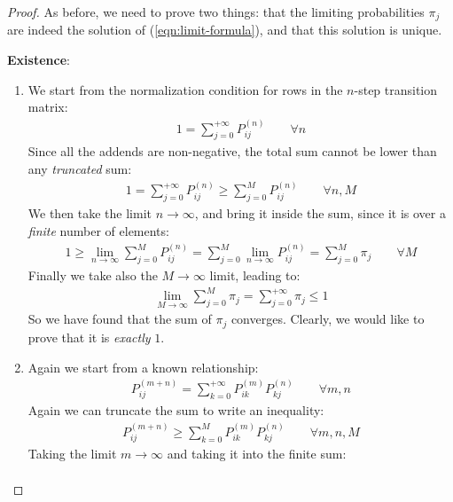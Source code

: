 \documentclass[../template.tex]{subfiles}
\begin{document}
\begin{proof}
    As before, we need to prove two things: that the limiting probabilities $\pi_j$ are indeed the solution of (\ref{eqn:limit-formula}), and that this solution is unique.

    \medskip
    \textbf{Existence}: 
    \begin{enumerate}
        \item We start from the normalization condition for rows in the $n$-step transition matrix:
        \begin{align*}
            1 = \sum_{j=0}^{+\infty} P_{ij}^{(n)} \qquad \forall n
        \end{align*} 
        Since all the addends are non-negative, the total sum cannot be lower than any \textit{truncated} sum:
        \begin{align*}
            1 = \sum_{j=0}^{+\infty} P_{ij}^{(n)} \geq \sum_{j=0}^M P_{ij}^{(n)} \qquad \forall n,M
        \end{align*} 
        We then take the limit $n \to \infty$, and bring it inside the sum, since it is over a \textit{finite} number of elements:
        \begin{align*}
            1 \geq \lim_{n \to \infty} \sum_{j=0}^{M} P_{ij}^{(n)} = \sum_{j=0}^M \lim_{n \to \infty} P_{ij}^{(n)} = \sum_{j=0}^M \pi_j \qquad \forall M
        \end{align*}  
        Finally we take also the $M \to \infty$ limit, leading to:
        \begin{align} \label{eqn:norm-ineq}
            \lim_{M \to \infty} \sum_{j=0}^M \pi_j = \sum_{j=0}^{+\infty} \pi_j \leq 1
        \end{align}
        So we have found that the sum of $\pi_j$ converges. Clearly, we would like to prove that it is \textit{exactly} $1$. 
        \item Again we start from a known relationship:
        \begin{align*}
            P_{ij}^{(m+n)} = \sum_{k=0}^{+\infty} P_{ik}^{(m)} P_{kj}^{(n)} \qquad \forall m,n
        \end{align*}
        Again we can truncate the sum to write an inequality:
        \begin{align*}
            P_{ij}^{(m+n)} \geq \sum_{k=0}^M P_{ik}^{(m)} P_{kj}^{(n)} \qquad \forall m,n,M
        \end{align*}
        Taking the limit $m \to \infty$ and taking it into the finite sum:
        \begin{align*}

\end{align*}
\end{enumerate}
\end{proof}
\end{document}
